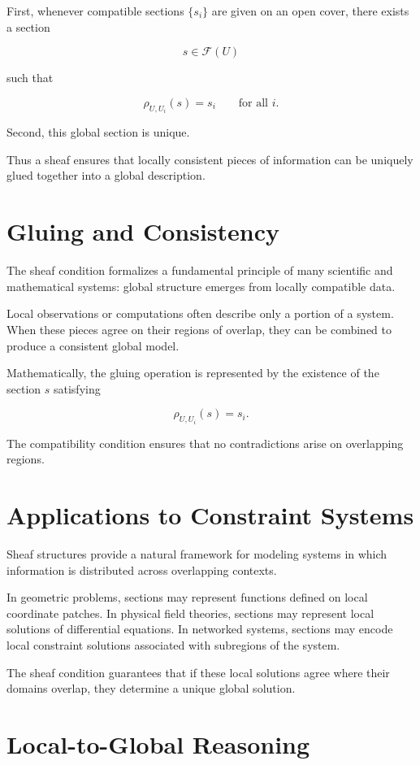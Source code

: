 \documentclass[11pt, openany]{book}
\theoremstyle{plain}
\theoremstyle{definition}
\theoremstyle{remark}
\begin{document}
First, whenever compatible sections $\{s_i\}$ are given on an open
cover, there exists a section

\[
s\in\mathcal{F}(U)
\]

such that

\[
\rho_{U,U_i}(s)=s_i
\qquad
\text{for all }i.
\]

Second, this global section is unique.

Thus a sheaf ensures that locally consistent pieces of information can
be uniquely glued together into a global description.

\section{Gluing and Consistency}

The sheaf condition formalizes a fundamental principle of many
scientific and mathematical systems: global structure emerges from
locally compatible data.

Local observations or computations often describe only a portion of a
system.  When these pieces agree on their regions of overlap, they can
be combined to produce a consistent global model.

Mathematically, the gluing operation is represented by the existence of
the section $s$ satisfying

\[
\rho_{U,U_i}(s)=s_i.
\]

The compatibility condition ensures that no contradictions arise on
overlapping regions.

\section{Applications to Constraint Systems}

Sheaf structures provide a natural framework for modeling systems in
which information is distributed across overlapping contexts.

In geometric problems, sections may represent functions defined on
local coordinate patches.  In physical field theories, sections may
represent local solutions of differential equations.  In networked
systems, sections may encode local constraint solutions associated with
subregions of the system.

The sheaf condition guarantees that if these local solutions agree where
their domains overlap, they determine a unique global solution.

\section{Local-to-Global Reasoning}
\end{document}
